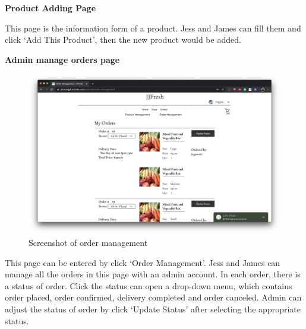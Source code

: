 \clearpage

\textbf{Product Adding Page}

This page is the information form of a product. Jess and James can fill them and click ‘Add This Product’, then the new product would be added.

\clearpage
\textbf{Admin manage orders page}
\begin{figure}[htp]
\centering
\includegraphics[width=\textwidth]{Figures/adminOrder.png}
\caption{Screenshot of order management}
\label{fig:adminOrder}
\end{figure}

This page can be entered by click ‘Order Management’. Jess and James can manage all the orders in this page with an admin account. In each order, there is a status of order. Click the status can open a drop-down menu, which contains order placed, order confirmed, delivery completed and order canceled. Admin can adjust the status of order by click ‘Update Status’ after selecting the appropriate status.